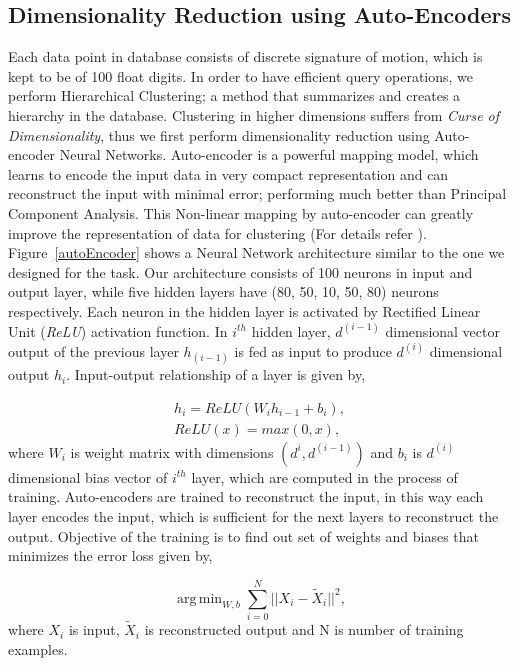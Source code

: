 \documentclass[twocolumn,10pt]{asme2e}
\DeclareMathOperator*{\argminA}{arg\,min}
\begin{document}
\subsection{Dimensionality Reduction using Auto-Encoders}
Each data point in database consists of discrete signature of motion, which is kept to be of 100 float digits.
In order to have efficient query operations, we perform Hierarchical Clustering; a method that summarizes and creates a hierarchy in the database.
Clustering in higher dimensions suffers from \emph{Curse of Dimensionality}\cite{marimont1979}, thus we first perform dimensionality reduction using Auto-encoder Neural Networks.
Auto-encoder is a powerful mapping model, which learns to encode the input data in very compact representation and can reconstruct the input with minimal error; performing much better than Principal Component Analysis\cite{hinton2006}.
This Non-linear mapping by auto-encoder can greatly improve the representation of data for clustering (For details refer \cite{song2013}).
Figure~\ref{autoEncoder} shows a Neural Network architecture similar to the one we designed for the task.
Our architecture consists of 100 neurons in input and output layer, while five hidden layers have (80, 50, 10, 50, 80) neurons respectively.
Each neuron in the hidden layer is activated by Rectified Linear Unit (\emph{ReLU}) activation function.
In $i^{th}$ hidden layer, $d^{(i-1)}$ dimensional vector output of the previous layer $h_(i-1)$ is fed as input to produce $d^{(i)}$ dimensional output $h_i$.
Input-output relationship of a layer is given by,

\begin{eqnarray}\label{nnlayer}
  h_i = ReLU(W_{i}h_{i-1} + b_{i}), \\
  ReLU(x) = max(0, x),
\end{eqnarray}
where $W_i$ is weight matrix with dimensions $(d^{i}, d^{(i-1)})$ and $b_i$ is $d^{(i)}$ dimensional bias vector of $i^{th}$ layer, which are computed in the process of training.
Auto-encoders are trained to reconstruct the input, in this way each layer encodes the input, which is sufficient for the next layers to reconstruct the output.
Objective of the training is to find out set of weights and biases that minimizes the error loss given by,

\begin{equation}\label{nnloss}
  \argminA_{W, b} \sum_{i=0}^{N} || X_i - \tilde{X}_i ||^2,
\end{equation}
where $X_i$ is input, $\tilde{X}_i$ is reconstructed output and N is number of training examples.
\end{document}

